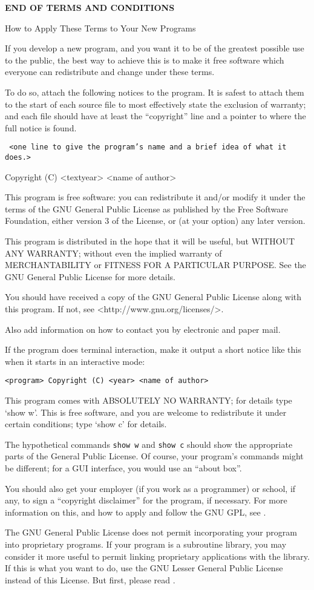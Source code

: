 {\bf END OF TERMS AND CONDITIONS}

\blank
How to Apply These Terms to Your New Programs

If you develop a new program, and you want it to be of the greatest possible use to the public, the best way to achieve this is to make it free software which everyone can redistribute and change under these terms.

To do so, attach the following notices to the program.  It is safest to attach them to the start of each source file to most effectively state the exclusion of warranty; and each file should have at least the ``copyright'' line and a pointer to where the full notice is found.

{\tt
<one line to give the program's name and a brief idea of what it does.>

Copyright (C) <textyear>  <name of author>

This program is free software: you can redistribute it and/or modify it under the terms of the GNU General Public License as published by the Free Software Foundation, either version 3 of the License, or (at your option) any later version.

This program is distributed in the hope that it will be useful, but WITHOUT ANY WARRANTY; without even the implied warranty of MERCHANTABILITY or FITNESS FOR A PARTICULAR PURPOSE.  See the GNU General Public License for more details.

You should have received a copy of the GNU General Public License along with this program.  If not, see <http://www.gnu.org/licenses/>.
}

Also add information on how to contact you by electronic and paper mail.

If the program does terminal interaction, make it output a short notice like this when it starts in an interactive mode:

{\tt <program>  Copyright (C) <year>  <name of author>

This program comes with ABSOLUTELY NO WARRANTY; for details type `show w'. This is free software, and you are welcome to redistribute it under certain conditions; type `show c' for details.}

The hypothetical commands {\tt show w} and {\tt show c} should show the appropriate parts of the General Public License.  Of course, your program's commands might be different; for a GUI interface, you would use an ``about box''.

You should also get your employer (if you work as a programmer) or school, if any, to sign a ``copyright disclaimer'' for the program, if necessary.  For more information on this, and how to apply and follow the GNU GPL, see .

The GNU General Public License does not permit incorporating your program into proprietary programs.  If your program is a subroutine library, you may consider it more useful to permit linking proprietary applications with the library.  If this is what you want to do, use the GNU Lesser General Public License instead of this License.  But first, please read .

\stopitemize


